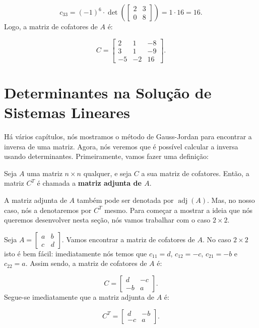 \begin{Example}
	$$
	c_{33} = (-1)^6\cdot\det\left(\begin{bmatrix}
		2 & 3 \\
		0 & 8
	\end{bmatrix}\right) = 1\cdot 16 = 16.
	$$
	Logo, a matriz de cofatores de $A$ é:
	
	$$
	C = \begin{bmatrix}
		2 & 1 & -8 \\
		3 & 1 & -9 \\
		-5 & -2 & 16
	\end{bmatrix}.
	$$
\end{Example}

\section{Determinantes na Solução de Sistemas Lineares}

Há vários capítulos, nós mostramos o método de Gauss-Jordan para encontrar a inversa de uma matriz. Agora, nós veremos que é possível calcular a inversa usando determinantes. Primeiramente, vamos fazer uma definição:

\begin{Definition}
	Seja $A$ uma matriz $n\times n$ qualquer, e seja $C$ a sua matriz de cofatores. Então, a matriz $C^T$ é chamada a \textbf{matriz adjunta de $A$}.
\end{Definition}

A matriz adjunta de $A$ também pode ser denotada por $\operatorname{adj}(A)$. Mas, no nosso caso, nós a denotaremos por $C^T$ mesmo. Para começar a mostrar a ideia que nós queremos desenvolver nesta seção, nós vamos trabalhar com o caso $2\times 2$.

Seja $A = \begin{bmatrix}
	a & b \\
	c & d
\end{bmatrix}$. Vamos encontrar a matriz de cofatores de $A$. No caso $2\times 2$ isto é bem fácil: imediatamente nós temos que $c_{11} = d$, $c_{12} = -c$, $c_{21} = -b$ e $c_{22} = a$. Assim sendo, a matriz de cofatores de $A$ é:

$$
C = \begin{bmatrix}
	d & -c \\
	-b & a
\end{bmatrix}.
$$
Segue-se imediatamente que a matriz adjunta de $A$ é:

$$
C^T = \begin{bmatrix}
	d & -b \\
	-c & a
\end{bmatrix}.
$$

